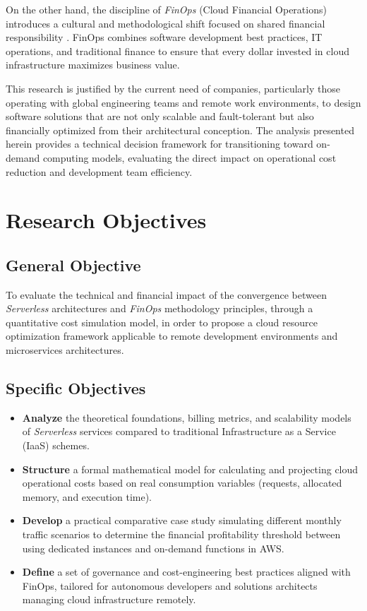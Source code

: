 \documentclass[conference]{IEEEtran}
\begin{document}
On the other hand, the discipline of \textit{FinOps} (Cloud Financial Operations) introduces a cultural and methodological shift focused on shared financial responsibility \cite{finops2023}. FinOps combines software development best practices, IT operations, and traditional finance to ensure that every dollar invested in cloud infrastructure maximizes business value.

This research is justified by the current need of companies, particularly those operating with global engineering teams and remote work environments, to design software solutions that are not only scalable and fault-tolerant but also financially optimized from their architectural conception. The analysis presented herein provides a technical decision framework for transitioning toward on-demand computing models, evaluating the direct impact on operational cost reduction and development team efficiency.

\section{Research Objectives}

\subsection{General Objective}
To evaluate the technical and financial impact of the convergence between \textit{Serverless} architectures and \textit{FinOps} methodology principles, through a quantitative cost simulation model, in order to propose a cloud resource optimization framework applicable to remote development environments and microservices architectures.

\subsection{Specific Objectives}
\begin{itemize}
    \item \textbf{Analyze} the theoretical foundations, billing metrics, and scalability models of \textit{Serverless} services compared to traditional Infrastructure as a Service (IaaS) schemes.
    \item \textbf{Structure} a formal mathematical model for calculating and projecting cloud operational costs based on real consumption variables (requests, allocated memory, and execution time).
    \item \textbf{Develop} a practical comparative case study simulating different monthly traffic scenarios to determine the financial profitability threshold between using dedicated instances and on-demand functions in AWS.
    \item \textbf{Define} a set of governance and cost-engineering best practices aligned with FinOps, tailored for autonomous developers and solutions architects managing cloud infrastructure remotely.
\end{itemize}
\end{document}
